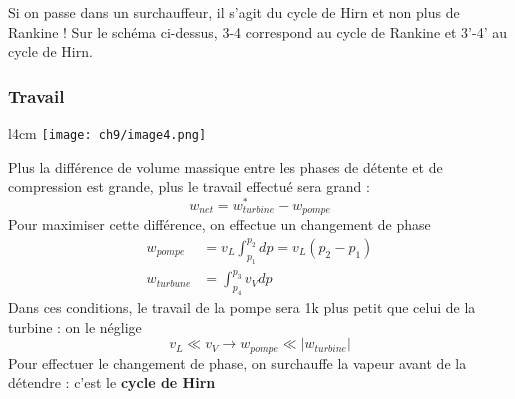 	\danger Si on passe dans un surchauffeur, il s'agit du cycle de  Hirn et non 
	plus de Rankine ! Sur le schéma ci-dessus, 3-4 correspond au cycle de Rankine 
	et 3'-4' au cycle de Hirn.
	
		\subsubsection{Travail}
		\begin{wrapfigure}[8]{l}{4cm}
		\vspace{-7mm}
		\texttt{[image: ch9/image4.png]}
		\end{wrapfigure}
		Plus la différence de volume massique entre les phases de détente et de 
		compression est grande, plus le travail effectué sera grand :
		\begin{equation}
		w_{net} = w_{turbine}^* - w_{pompe}
		\end{equation}
		Pour maximiser cette différence, on effectue un changement de phase 
		\begin{equation}
		\begin{array}{ll}
		w_{pompe} &= v_L \int_{p_1}^{p_2} dp = v_L(p_2-p_1)\\
		w_{turbune} &= \int_{p_4}^{p_3} v_Vdp
		\end{array}
		\end{equation}
		Dans ces conditions, le travail de la pompe sera 1k plus petit que celui 
		de la turbine : on le néglige
		\begin{equation}
		v_L \ll v_V \rightarrow w_{pompe} \ll |w_{turbine}|
		\end{equation}
		Pour effectuer le changement de phase, on surchauffe la vapeur avant de 
		la détendre : c'est le \textbf{cycle de Hirn}
		
